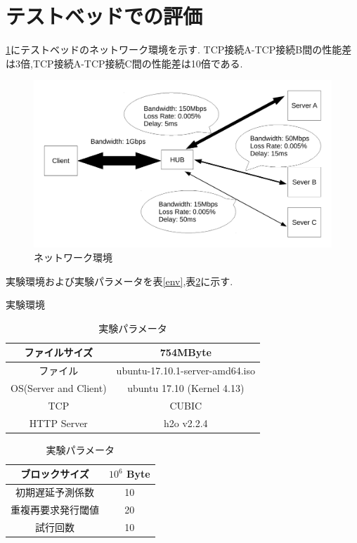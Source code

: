 \documentclass[a4j,12pt]{gradthesis_utf8}
\begin{document}
\clearpage

\section{テストベッドでの評価}
\label{testbed}
\ref{networkmodel}にテストベッドのネットワーク環境を示す.
TCP接続A-TCP接続B間の性能差は3倍,TCP接続A-TCP接続C間の性能差は10倍である.
\begin{figure}[ht]
	\label{networkmodel}
	\begin{center}
		\includegraphics[width=16cm]{figure/test_network.pdf}
		\caption{ネットワーク環境}
	\end{center}
\end{figure}

実験環境および実験パラメータを表\ref{env},表\ref{param}に示す.

\begin{table}[htb]
	\begin{center}
		\caption{実験環境}
		\label{env}
		\begin{tabular}{|c|c|} \hline
			ファイルサイズ & 754MByte\\ \hline
			ファイル &  ubuntu-17.10.1-server-amd64.iso\\ \hline
			OS(Server and Client) & ubuntu 17.10 (Kernel 4.13)\\ \hline
			TCP & CUBIC \\ \hline
			HTTP Server & h2o v2.2.4 \\ \hline
		\end{tabular}
		\caption{実験パラメータ}
		\label{param}
		\begin{tabular}{|c|c|} \hline
			ブロックサイズ & \(10^6\) Byte\\ \hline
			初期遅延予測係数 & 10 \\ \hline
			重複再要求発行閾値 & 20 \\ \hline
			試行回数 & 10 \\ \hline
		\end{tabular}
	\end{center}
\end{table}
\end{document}
